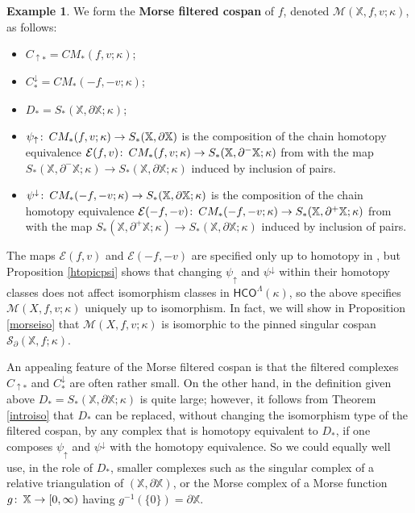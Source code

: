 \documentclass[11pt]{amsart}
\theoremstyle{definition}
\newtheorem{ex}[theorem]{Example}
\theoremstyle{remark}
\numberwithin{equation}{section}
\def\co{\colon\thinspace}
\begin{document}
\begin{ex}
	We form the \textbf{Morse filtered cospan} of $f$, denoted $\mathcal{M}(\mathbb{X},f,v;\kappa)$, as follows: \begin{itemize} 
		\item $C_{\uparrow *}=CM_*(f,v;\kappa)$;
		\item $C^{\downarrow}_{*}=CM_*(-f,-v;\kappa)$;
		\item $D_*=S_*(\mathbb{X},\partial\mathbb{X};\kappa)$;
		\item $\psi_{\uparrow}\co CM_*(f,v;\kappa)\to S_*(\mathbb{X},\partial\mathbb{X})$ is the composition of the chain homotopy equivalence $\mathcal{E}(f,v)\co CM_*(f,v;\kappa)\to S_*(\mathbb{X},\partial^-\mathbb{X};\kappa)$ from \cite[p. 218]{Paj} with the map $ S_*(\mathbb{X},\partial^-\mathbb{X};\kappa)\to S_*(\mathbb{X},\partial\mathbb{X};\kappa)$ induced by inclusion of pairs.
		\item $\psi^{\downarrow}\co CM_*(-f,-v;\kappa)\to S_*(\mathbb{X},\partial\mathbb{X};\kappa)$ is the composition of the chain homotopy equivalence $\mathcal{E}(-f,-v)\co CM_*(-f,-v;\kappa)\to S_*(\mathbb{X},\partial^+\mathbb{X};\kappa)$ from \cite[p. 218]{Paj} with the map $ S_*(\mathbb{X},\partial^+\mathbb{X};\kappa)\to S_*(\mathbb{X},\partial\mathbb{X};\kappa)$ induced by inclusion of pairs.
\end{itemize}
The maps $\mathcal{E}(f,v)$ and $\mathcal{E}(-f,-v)$ are specified only up to homotopy in \cite{Paj}, but Proposition \ref{htopicpsi} shows that changing $\psi_{\uparrow}$ and $\psi^{\downarrow}$ within their homotopy classes does not affect isomorphism classes in $\mathsf{HCO}^{\Lambda}(\kappa)$, so the above specifies $\mathcal{M}(X,f,v;\kappa)$ uniquely up to isomorphism.  In fact, we will show in Proposition \ref{morseiso} that $\mathcal{M}(X,f,v;\kappa)$ is isomorphic to the pinned singular cospan $\mathcal{S}_{\partial}(\mathbb{X},f;\kappa)$.  

An appealing feature of the Morse filtered cospan is that the filtered complexes $C_{\uparrow *}$ and $C^{\downarrow}_{*}$  are often rather small.  On the other hand, in the definition given above $D_*=S_*(\mathbb{X},\partial\mathbb{X};\kappa)$ is quite large; however, it follows from Theorem \ref{introiso} that $D_*$ can be replaced, without changing the isomorphism type of the filtered cospan, by any complex that is homotopy equivalent to $D_*$, if one composes $\psi_{\uparrow}$ and $\psi^{\downarrow}$ with the homotopy equivalence.  So we could equally well use, in the role of $D_*$, smaller complexes such as the singular complex of a relative triangulation of $(\mathbb{X},\partial\mathbb{X})$, or the Morse complex of a Morse function $g\co \mathbb{X}\to [0,\infty)$ having $g^{-1}(\{0\})=\partial \mathbb{X}$.  


\end{ex}
\end{document}

